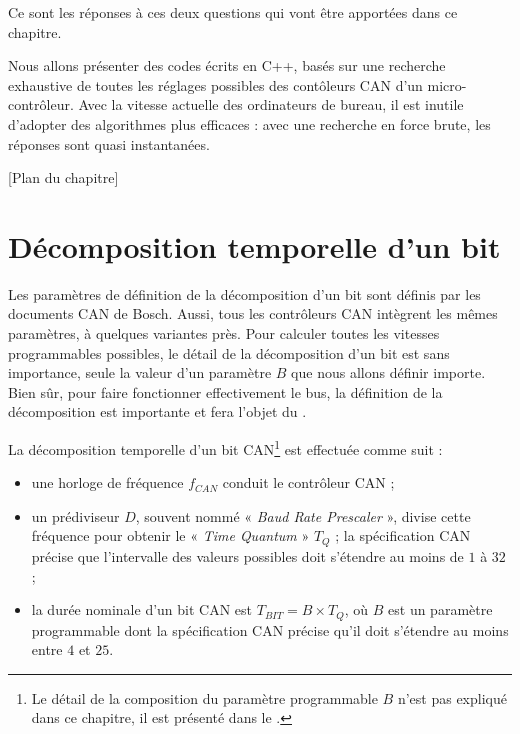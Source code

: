 Ce sont les réponses à ces deux questions qui vont être apportées dans ce chapitre.

Nous allons présenter des codes écrits en C++, basés sur une recherche exhaustive de toutes les réglages possibles des contôleurs CAN d'un micro-contrôleur. Avec la vitesse actuelle des ordinateurs de bureau, il est inutile d'adopter des algorithmes plus efficaces : avec une recherche en force brute, les réponses sont quasi instantanées.

[Plan du chapitre] \pasFini





\section{Décomposition temporelle d'un bit}

Les paramètres de définition de la décomposition d'un bit sont définis par les documents CAN de Bosch\cite{canSpecifBosch}. Aussi, tous les contrôleurs CAN intègrent les mêmes paramètres, à quelques variantes près. Pour calculer toutes les vitesses programmables possibles, le détail de la décomposition d'un bit est sans importance, seule la valeur d'un paramètre $B$ que nous allons définir importe. Bien sûr, pour faire fonctionner effectivement le bus, la définition de la décomposition est importante et fera l'objet du .

La décomposition temporelle d'un bit CAN\footnote{Le détail de la composition du paramètre programmable $B$ n'est pas expliqué dans ce chapitre, il est présenté dans le .} est effectuée comme suit :
\begin{itemize}
\item une horloge de fréquence $f_{CAN}$ conduit le contrôleur CAN ;
\item un prédiviseur $D$, souvent nommé « \emph{Baud Rate Prescaler} », divise cette fréquence pour obtenir le « \emph{Time Quantum} » $T_Q$ ; la spécification CAN précise que l'intervalle des valeurs possibles doit s'étendre au moins de $1$ à $32$ ;
\item la durée nominale d'un bit CAN est $T_{BIT} = B\times T_Q$, où $B$ est un paramètre programmable dont la spécification CAN \cite{canSpecifBosch} précise qu'il doit s'étendre au moins entre $4$ et $25$.
\end{itemize}

